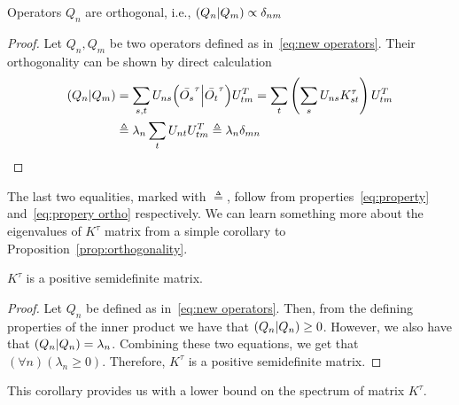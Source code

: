 \begin{proposition}
Operators \(Q_n\) are orthogonal, i.e., \(\left(Q_n \middle| Q_m\right) \propto \delta_{nm}\)
\label{prop:orthogonality}
\end{proposition}
\begin{proof}
  Let \(Q_n,Q_m\) be two operators defined as in~\eqref{eq:new operators}.
  Their orthogonality can be shown by direct calculation
  \begin{align*}
    \left(Q_n \middle| Q_m\right) &= \sum_{s,t} U_{ns} {\left(\bar{O_s}^{\tau} \middle| \bar{O_t}^{\tau}\right)} U_{tm}^{T} 
    = \sum_{t} \left(\sum_{s}U_{ns} K_{st}^{\tau}\right)  U_{tm}^{T} \\ 
    &\triangleq \lambda_n \sum_t U_{nt} U_{tm}^{T} \triangleq \lambda_n \delta_{mn}
  \end{align*}
\end{proof}
The last two equalities, marked with \(\triangleq \), follow from properties~\eqref{eq:property} 
and~\eqref{eq:propery ortho} respectively. We can learn something more
about the eigenvalues of \(K^{\tau}\) matrix from a simple corollary to Proposition~\ref{prop:orthogonality}.
\begin{corollary}
  \(K^{\tau}\) is a positive semidefinite matrix.\label{corr:psd}
\end{corollary}
\begin{proof}
Let \(Q_n\) be defined as in~\eqref{eq:new operators}. Then, from the defining properties of the inner product we have that
\(\left(Q_n \middle| Q_n\right) \geq 0\). However, we also have that \(\left(Q_n \middle| Q_n\right) = \lambda_n\). Combining these two equations, we get
that \(\left(\forall n\right) \left(\lambda_n \geq 0\right)\). Therefore, \(K^{\tau}\) is a positive semidefinite matrix.
\end{proof}
This corollary provides us with a lower bound on the spectrum of matrix \(K^{\tau}\). 

